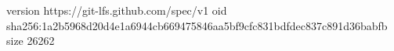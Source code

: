 version https://git-lfs.github.com/spec/v1
oid sha256:1a2b5968d20d4e1a6944cb669475846aa5bf9cfc831bdfdec837c891d36babfb
size 26262
